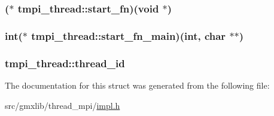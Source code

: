 \hypertarget{structtmpi__thread_a45e547b636ede3504c7db19ac15b5af4}{
\subsubsection[{start\-\_\-fn}]{($\ast$ {\bf tmpi\-\_\-thread\-::start\-\_\-fn})({\bf void} $\ast$)}}\label{structtmpi__thread_a45e547b636ede3504c7db19ac15b5af4}
\hypertarget{structtmpi__thread_af76717bbc4841165b36774987bc588a0}{
\subsubsection[{start\-\_\-fn\-\_\-main}]{\setlength{\rightskip}{0pt plus 5cm}int($\ast$ {\bf tmpi\-\_\-thread\-::start\-\_\-fn\-\_\-main})(int, char $\ast$$\ast$)}}\label{structtmpi__thread_af76717bbc4841165b36774987bc588a0}
\hypertarget{structtmpi__thread_ab76767898f5c6bc4a0a2c225d34e8b59}{
\subsubsection[{thread\-\_\-id}]{ {\bf tmpi\-\_\-thread\-::thread\-\_\-id}}}\label{structtmpi__thread_ab76767898f5c6bc4a0a2c225d34e8b59}


\-The documentation for this struct was generated from the following file\-:\begin{DoxyCompactItemize}
\item 
src/gmxlib/thread\-\_\-mpi/\hyperlink{impl_8h}{impl.\-h}\end{DoxyCompactItemize}
